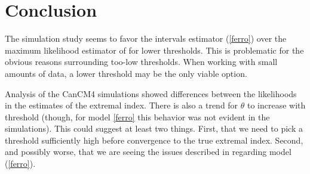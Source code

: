 \section{Conclusion}
\label{conclusion}

The simulation study seems to favor the intervals estimator (\ref{ferro}) over the maximum likelihood estimator of \cite{suveges2010model} for lower thresholds. This is problematic for the obvious reasons surrounding too-low thresholds. When working with small amounts of data, a lower threshold may be the only viable option.

Analysis of the CanCM4 simulations showed differences between the likelihoods in the estimates of the extremal index. There is also a trend for $\theta$ to increase with threshold (though, for model \ref{ferro} this behavior was not evident in the simulations). This could suggest at least two things. First, that we need to pick a threshold sufficiently high before convergence to the true extremal index. Second, and possibly worse, that we are seeing the issues described in \cite{ferro2003inference} regarding model (\ref{ferro}).

